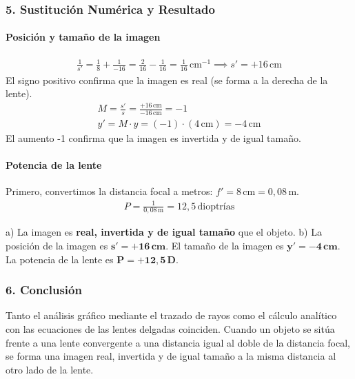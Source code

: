 \subsubsection*{5. Sustitución Numérica y Resultado}
\paragraph{Posición y tamaño de la imagen}
\begin{gather}
    \frac{1}{s'} = \frac{1}{8} + \frac{1}{-16} = \frac{2}{16} - \frac{1}{16} = \frac{1}{16} \, \text{cm}^{-1} \implies s' = +16 \, \text{cm}
\end{gather}
El signo positivo confirma que la imagen es real (se forma a la derecha de la lente).
\begin{gather}
    M = \frac{s'}{s} = \frac{+16 \, \text{cm}}{-16 \, \text{cm}} = -1 \\
    y' = M \cdot y = (-1) \cdot (4 \, \text{cm}) = -4 \, \text{cm}
\end{gather}
El aumento -1 confirma que la imagen es invertida y de igual tamaño.

\paragraph{Potencia de la lente}
Primero, convertimos la distancia focal a metros: $f' = 8 \, \text{cm} = 0,08 \, \text{m}$.
\begin{gather}
    P = \frac{1}{0,08 \, \text{m}} = 12,5 \, \text{dioptrías}
\end{gather}
\begin{cajaresultado}
a) La imagen es \textbf{real, invertida y de igual tamaño} que el objeto.
b) La posición de la imagen es $\boldsymbol{s' = +16 \, \textbf{cm}}$. El tamaño de la imagen es $\boldsymbol{y' = -4 \, \textbf{cm}}$. La potencia de la lente es $\boldsymbol{P = +12,5 \, \textbf{D}}$.
\end{cajaresultado}

\subsubsection*{6. Conclusión}
\begin{cajaconclusion}
Tanto el análisis gráfico mediante el trazado de rayos como el cálculo analítico con las ecuaciones de las lentes delgadas coinciden. Cuando un objeto se sitúa frente a una lente convergente a una distancia igual al doble de la distancia focal, se forma una imagen real, invertida y de igual tamaño a la misma distancia al otro lado de la lente.
\end{cajaconclusion}

